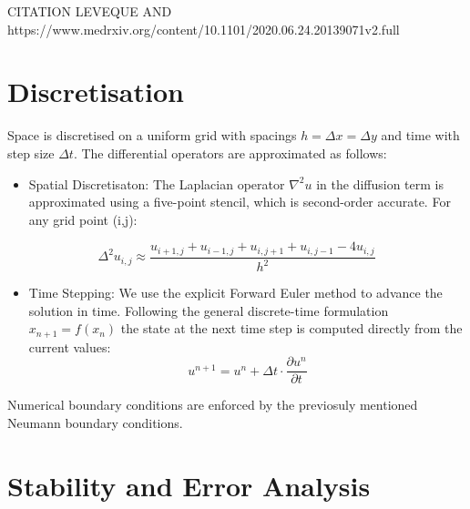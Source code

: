 \documentclass[
]{article}
\providecommand{\tightlist}{%
  \setlength{\itemsep}{0pt}\setlength{\parskip}{0pt}}
\begin{document}
CITATION LEVEQUE AND
https://www.medrxiv.org/content/10.1101/2020.06.24.20139071v2.full

\section{Discretisation}\label{discretisation}

Space is discretised on a uniform grid with spacings
\(h = \Delta x = \Delta y\) and time with step size \(\Delta t\). The
differential operators are approximated as follows:

\begin{itemize}
\tightlist
\item
  Spatial Discretisaton: The Laplacian operator \(\nabla^2 u\) in the
  diffusion term is approximated using a five-point stencil, which is
  second-order accurate. For any grid point (i,j):
\end{itemize}

\[
\Delta^2u_{i,j} \approx \frac{u_{i+1,j}+u_{i-1,j}+ u_{i,j+1}+u_{i,j-1}-4u_{i,j}}{h^2}
\]

\begin{itemize}
\tightlist
\item
  Time Stepping: We use the explicit Forward Euler method to advance the
  solution in time. Following the general discrete-time formulation
  \(x_{n+1}=f(x_n)\) the state at the next time step is computed
  directly from the current values: \[
  u^{n+1} = u^n + \Delta t \cdot \frac{\partial u^n}{\partial t}
  \]
\end{itemize}

Numerical boundary conditions are enforced by the previosuly mentioned
Neumann boundary conditions.

\section{Stability and Error
Analysis}\label{stability-and-error-analysis}
\end{document}
